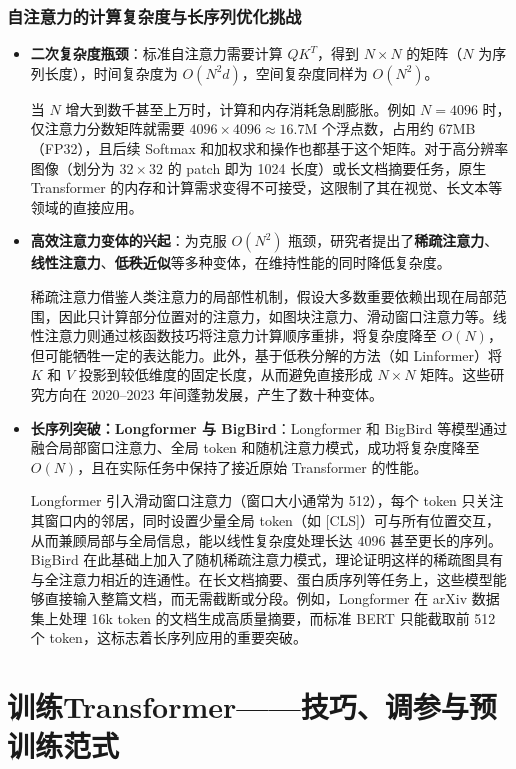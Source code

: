 \documentclass[11pt]{beamer}
\begin{document}
\begin{frame}
\frametitle{自注意力的计算复杂度与长序列优化挑战}
\begin{itemize}
  \item \textbf{二次复杂度瓶颈}：标准自注意力需要计算 $QK^T$，得到 $N\times N$ 的矩阵（$N$ 为序列长度），时间复杂度为 $O(N^2 d)$，空间复杂度同样为 $O(N^2)$。\par
  当 $N$ 增大到数千甚至上万时，计算和内存消耗急剧膨胀。例如 $N=4096$ 时，仅注意力分数矩阵就需要 $4096\times4096\approx 16.7$M 个浮点数，占用约 67MB（FP32），且后续 Softmax 和加权求和操作也都基于这个矩阵。对于高分辨率图像（划分为 $32\times32$ 的 patch 即为 1024 长度）或长文档摘要任务，原生 Transformer 的内存和计算需求变得不可接受，这限制了其在视觉、长文本等领域的直接应用。

  \item \textbf{高效注意力变体的兴起}：为克服 $O(N^2)$ 瓶颈，研究者提出了\textbf{稀疏注意力}、\textbf{线性注意力}、\textbf{低秩近似}等多种变体，在维持性能的同时降低复杂度。\par
  稀疏注意力借鉴人类注意力的局部性机制，假设大多数重要依赖出现在局部范围，因此只计算部分位置对的注意力，如图块注意力、滑动窗口注意力等。线性注意力则通过核函数技巧将注意力计算顺序重排，将复杂度降至 $O(N)$，但可能牺牲一定的表达能力。此外，基于低秩分解的方法（如 Linformer）将 $K$ 和 $V$ 投影到较低维度的固定长度，从而避免直接形成 $N\times N$ 矩阵。这些研究方向在 2020–2023 年间蓬勃发展，产生了数十种变体。

  \item \textbf{长序列突破：Longformer 与 BigBird}：Longformer 和 BigBird 等模型通过融合局部窗口注意力、全局 token 和随机注意力模式，成功将复杂度降至 $O(N)$，且在实际任务中保持了接近原始 Transformer 的性能。\par
  Longformer 引入滑动窗口注意力（窗口大小通常为 512），每个 token 只关注其窗口内的邻居，同时设置少量全局 token（如 [CLS]）可与所有位置交互，从而兼顾局部与全局信息，能以线性复杂度处理长达 4096 甚至更长的序列。BigBird 在此基础上加入了随机稀疏注意力模式，理论证明这样的稀疏图具有与全注意力相近的连通性。在长文档摘要、蛋白质序列等任务上，这些模型能够直接输入整篇文档，而无需截断或分段。例如，Longformer 在 arXiv 数据集上处理 16k token 的文档生成高质量摘要，而标准 BERT 只能截取前 512 个 token，这标志着\alert{长序列应用的重要突破}。
\end{itemize}
\end{frame}

\section{训练Transformer——技巧、调参与预训练范式}
\end{document}
